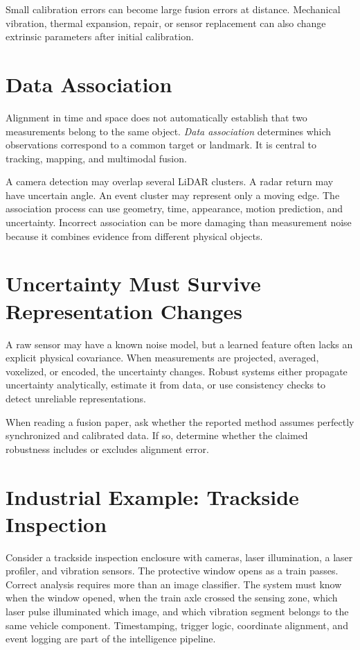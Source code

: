Small calibration errors can become large fusion errors at distance. Mechanical vibration, thermal expansion, repair, or sensor replacement can also change extrinsic parameters after initial calibration.

\section{Data Association}

Alignment in time and space does not automatically establish that two measurements belong to the same object. \emph{Data association} determines which observations correspond to a common target or landmark. It is central to tracking, mapping, and multimodal fusion.

A camera detection may overlap several LiDAR clusters. A radar return may have uncertain angle. An event cluster may represent only a moving edge. The association process can use geometry, time, appearance, motion prediction, and uncertainty. Incorrect association can be more damaging than measurement noise because it combines evidence from different physical objects.

\section{Uncertainty Must Survive Representation Changes}

A raw sensor may have a known noise model, but a learned feature often lacks an explicit physical covariance. When measurements are projected, averaged, voxelized, or encoded, the uncertainty changes. Robust systems either propagate uncertainty analytically, estimate it from data, or use consistency checks to detect unreliable representations.

\begin{engineeringcheck}
When reading a fusion paper, ask whether the reported method assumes perfectly synchronized and calibrated data. If so, determine whether the claimed robustness includes or excludes alignment error.
\end{engineeringcheck}

\section{Industrial Example: Trackside Inspection}

Consider a trackside inspection enclosure with cameras, laser illumination, a laser profiler, and vibration sensors. The protective window opens as a train passes. Correct analysis requires more than an image classifier. The system must know when the window opened, when the train axle crossed the sensing zone, which laser pulse illuminated which image, and which vibration segment belongs to the same vehicle component. Timestamping, trigger logic, coordinate alignment, and event logging are part of the intelligence pipeline.


